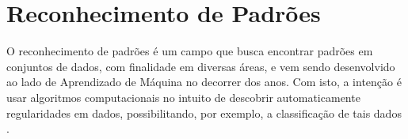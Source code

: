 





\section{Reconhecimento de Padrões}
\label{sec:patternrec}

O reconhecimento de padrões é um campo que busca encontrar padrões em conjuntos de dados, com finalidade em diversas áreas, e vem sendo desenvolvido ao lado de Aprendizado de Máquina no decorrer dos anos. Com isto, a intenção é usar algoritmos computacionais no intuito de descobrir automaticamente regularidades em dados, possibilitando, por exemplo, a classificação de tais dados \cite{bishop:2006}.

